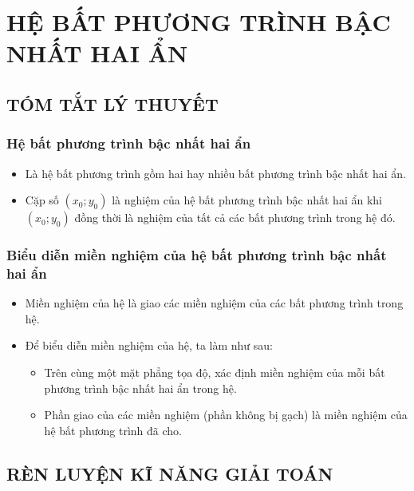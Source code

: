 \section{HỆ BẤT PHƯƠNG TRÌNH BẬC NHẤT HAI ẨN}

\subsection{TÓM TẮT LÝ THUYẾT}
\subsubsection{Hệ bất phương trình bậc nhất hai ẩn}
\begin{itemize}
	\item [\iconCH] Là hệ bất phương trình gồm hai hay nhiều bất phương trình bậc nhất hai ẩn.
	\item [\iconCH] Cặp số $(x_0;y_0)$ là nghiệm của hệ bất phương trình bậc nhất hai ẩn khi $(x_0;y_0)$ đồng thời là nghiệm của tất cả các bất phương trình trong hệ đó.
\end{itemize}
\subsubsection{Biểu diễn miền nghiệm của hệ bất phương trình bậc nhất hai ẩn}
\begin{itemize}
	\item [\iconCH] Miền nghiệm của hệ là giao các miền nghiệm của các bất phương trình trong hệ.
	\item [\iconCH] Để biểu diễn miền nghiệm của hệ, ta làm như sau:
	\begin{boxdn}
	\begin{itemize}
		\item [$\bullet$] Trên cùng một mặt phẳng tọa độ, xác định miền nghiệm của mỗi bất phương trình bậc nhất hai ẩn trong hệ.
		\item [$\bullet$] Phần giao của các miền nghiệm (phần không bị gạch) là miền nghiệm của hệ bất phương trình đã cho.
	\end{itemize}
	\end{boxdn}
\end{itemize}

\subsection{RÈN LUYỆN KĨ NĂNG GIẢI TOÁN}

